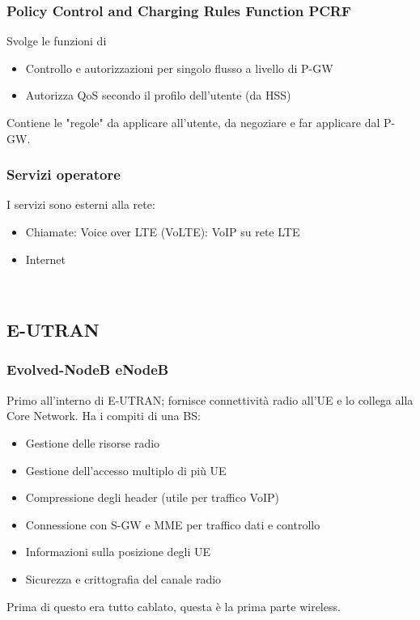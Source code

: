 \subsubsection{Policy Control and Charging Rules Function PCRF} 

Svolge le funzioni di 
\begin{itemize}
	\item Controllo e autorizzazioni per singolo flusso a livello di P-GW
	\item Autorizza QoS secondo il profilo dell'utente (da HSS)
\end{itemize}
Contiene le "regole" da applicare all'utente, da negoziare e far applicare dal P-GW.

\subsubsection{Servizi operatore} 

I servizi sono esterni alla rete: 
\begin{itemize}
	\item Chiamate: Voice over LTE (VoLTE): VoIP su rete LTE
	\item Internet
\end{itemize}

\hfill \\

\subsection{E-UTRAN}

\subsubsection{Evolved-NodeB eNodeB} 

Primo all'interno di E-UTRAN; fornisce connettività radio all'UE e lo collega alla Core Network. Ha i compiti di una BS:
\begin{itemize}
	\item Gestione delle risorse radio
	\item Gestione dell'accesso multiplo di più UE
	\item Compressione degli header (utile per traffico VoIP)
	\item Connessione con S-GW e MME per traffico dati e controllo
	\item Informazioni sulla posizione degli UE
	\item Sicurezza e crittografia del canale radio
\end{itemize}
Prima di questo era tutto cablato, questa è la prima parte wireless.\\

